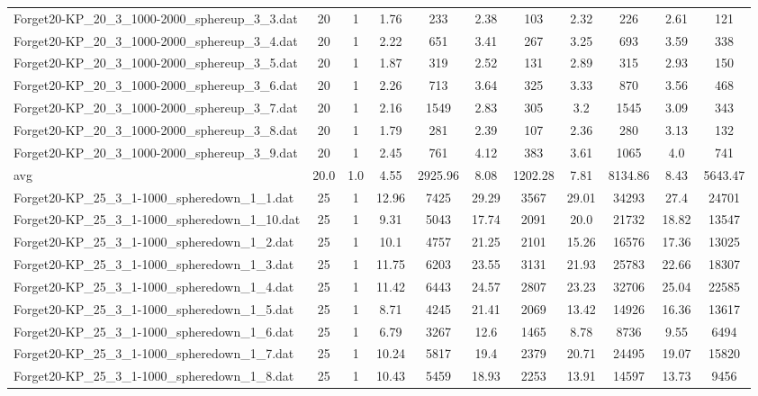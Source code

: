 \begin{table}[!ht]
\begin{tabular}{lcccccccccc}
Forget20-KP\_20\_3\_1000-2000\_sphereup\_3\_3.dat & 20 & 1 & 1.76 & 233 & 2.38 & 103 & 2.32 & 226 & 2.61 & 121 \\
Forget20-KP\_20\_3\_1000-2000\_sphereup\_3\_4.dat & 20 & 1 & 2.22 & 651 & 3.41 & 267 & 3.25 & 693 & 3.59 & 338 \\
Forget20-KP\_20\_3\_1000-2000\_sphereup\_3\_5.dat & 20 & 1 & 1.87 & 319 & 2.52 & 131 & 2.89 & 315 & 2.93 & 150 \\
Forget20-KP\_20\_3\_1000-2000\_sphereup\_3\_6.dat & 20 & 1 & 2.26 & 713 & 3.64 & 325 & 3.33 & 870 & 3.56 & 468 \\
Forget20-KP\_20\_3\_1000-2000\_sphereup\_3\_7.dat & 20 & 1 & 2.16 & 1549 & 2.83 & 305 & 3.2 & 1545 & 3.09 & 343 \\
Forget20-KP\_20\_3\_1000-2000\_sphereup\_3\_8.dat & 20 & 1 & 1.79 & 281 & 2.39 & 107 & 2.36 & 280 & 3.13 & 132 \\
Forget20-KP\_20\_3\_1000-2000\_sphereup\_3\_9.dat & 20 & 1 & 2.45 & 761 & 4.12 & 383 & 3.61 & 1065 & 4.0 & 741 \\
\hline avg & 20.0 & 1.0 & 4.55& 2925.96 & 8.08& 1202.28 & 7.81& 8134.86 & 8.43& 5643.47\\ \hline
Forget20-KP\_25\_3\_1-1000\_spheredown\_1\_1.dat & 25 & 1 & 12.96 & 7425 & 29.29 & 3567 & 29.01 & 34293 & 27.4 & 24701 \\
Forget20-KP\_25\_3\_1-1000\_spheredown\_1\_10.dat & 25 & 1 & 9.31 & 5043 & 17.74 & 2091 & 20.0 & 21732 & 18.82 & 13547 \\
Forget20-KP\_25\_3\_1-1000\_spheredown\_1\_2.dat & 25 & 1 & 10.1 & 4757 & 21.25 & 2101 & 15.26 & 16576 & 17.36 & 13025 \\
Forget20-KP\_25\_3\_1-1000\_spheredown\_1\_3.dat & 25 & 1 & 11.75 & 6203 & 23.55 & 3131 & 21.93 & 25783 & 22.66 & 18307 \\
Forget20-KP\_25\_3\_1-1000\_spheredown\_1\_4.dat & 25 & 1 & 11.42 & 6443 & 24.57 & 2807 & 23.23 & 32706 & 25.04 & 22585 \\
Forget20-KP\_25\_3\_1-1000\_spheredown\_1\_5.dat & 25 & 1 & 8.71 & 4245 & 21.41 & 2069 & 13.42 & 14926 & 16.36 & 13617 \\
Forget20-KP\_25\_3\_1-1000\_spheredown\_1\_6.dat & 25 & 1 & 6.79 & 3267 & 12.6 & 1465 & 8.78 & 8736 & 9.55 & 6494 \\
Forget20-KP\_25\_3\_1-1000\_spheredown\_1\_7.dat & 25 & 1 & 10.24 & 5817 & 19.4 & 2379 & 20.71 & 24495 & 19.07 & 15820 \\
Forget20-KP\_25\_3\_1-1000\_spheredown\_1\_8.dat & 25 & 1 & 10.43 & 5459 & 18.93 & 2253 & 13.91 & 14597 & 13.73 & 9456 \\

\end{tabular}
\end{table}
